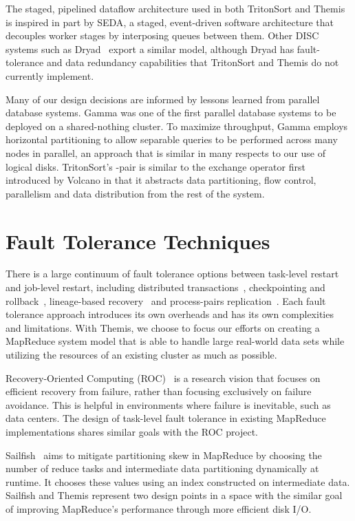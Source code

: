 The staged, pipelined dataflow architecture used in both TritonSort and Themis
is inspired in part by SEDA\cite{seda}, a staged, event-driven software
architecture that decouples worker stages by interposing queues between them.
Other DISC systems such as Dryad~\cite{dryad} export a similar model, although
Dryad has fault-tolerance and data redundancy capabilities that TritonSort and
Themis do not currently implement.

Many of our design decisions are informed by lessons learned from parallel
database systems.  Gamma\cite{gamma} was one of the first parallel database
systems to be deployed on a shared-nothing cluster.  To maximize throughput,
Gamma employs horizontal partitioning to allow separable queries to be
performed across many nodes in parallel, an approach that is similar in many
respects to our use of logical disks.  TritonSort's \sender-\receiver pair is
similar to the exchange operator first introduced by Volcano\cite{volcano} in
that it abstracts data partitioning, flow control, parallelism and data
distribution from the rest of the system.

\section{Fault Tolerance Techniques}

There is a large continuum of fault tolerance options between task-level
restart and job-level restart, including distributed
transactions~\cite{percolator}, checkpointing and
rollback~\cite{Elnozahy:2002:SRP:568522.568525}, lineage-based
recovery~\cite{spark} and process-pairs replication~\cite{flux}. Each fault
tolerance approach introduces its own overheads and has its own complexities
and limitations.  With Themis, we choose to focus our efforts on creating a
MapReduce system model that is able to handle large real-world data sets while
utilizing the resources of an existing cluster as much as possible.

Recovery-Oriented Computing (ROC)~\cite{roc,microreboot} is a research vision
that focuses on efficient recovery from failure, rather than focusing
exclusively on failure avoidance.  This is helpful in environments where
failure is inevitable, such as data centers.  The design of task-level fault
tolerance in existing MapReduce implementations shares similar goals with the ROC
project.

Sailfish~\cite{sailfish} aims to mitigate partitioning skew in MapReduce by
choosing the number of reduce tasks and intermediate data partitioning
dynamically at runtime. It chooses these values using an index constructed on
intermediate data. Sailfish and Themis represent two design points in a space
with the similar goal of improving MapReduce's performance through more
efficient disk I/O.

